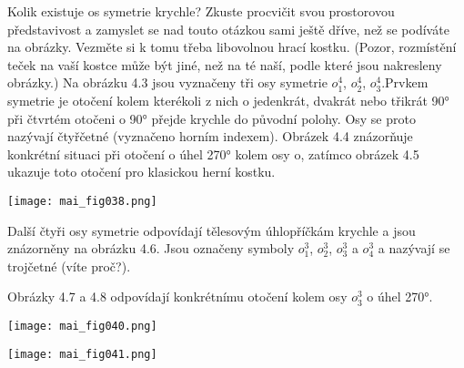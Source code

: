 \begin{mdframed}[style=mdexam]
\begin{example}
      Kolik existuje os symetrie krychle? Zkuste procvičit svou prostorovou představivost a zamyslet
      se nad touto  otázkou sami ještě dříve, než se podíváte na obrázky. Vezměte si k tomu třeba
      libovolnou hrací kostku. (Pozor, rozmístění teček na vaší kostce může být jiné, než na té
      naší, podle které jsou nakresleny obrázky.) Na obrázku 4.3 jsou vyznačeny tři osy symetrie
      \(o_1^4\), \(o_2^4\), \(o_3^4\).Prvkem symetrie je otočení kolem kterékoli z nich o jedenkrát,
      dvakrát nebo třikrát \ang{90} při čtvrtém otočeni o \ang{90} přejde krychle do původní polohy.
      Osy se proto nazývají čtyřčetné (vyznačeno horním indexem). Obrázek 4.4 znázorňuje konkrétní
      situaci při otočení o úhel \ang{270} kolem osy o, zatímco obrázek 4.5 ukazuje toto otočení pro
      klasickou herní kostku.

    {\centering
      \captionsetup{type=figure}
      \texttt{[image: mai\_fig038.png]}
      \par}
    
      Další čtyři osy symetrie odpovídají tělesovým úhlopříčkám krychle a jsou znázorněny na obrázku
      4.6. Jsou označeny symboly \(o_1^3\), \(o_2^3\), \(o_3^3\) a \(o_4^3\) a nazývají se trojčetné
      (víte proč?).

    {\centering
      \captionsetup{type=figure}
      \label{mai:fig039}
    \par}


      Obrázky 4.7 a 4.8 odpovídají konkrétnímu otočení kolem osy \(o_3^3\) o úhel \ang{270}.

    {\centering
      \captionsetup{type=figure}
      \texttt{[image: mai\_fig040.png]}
      \par}
      

    {\centering
      \captionsetup{type=figure}
      \texttt{[image: mai\_fig041.png]}
      \par}


\end{example}
\end{mdframed}
